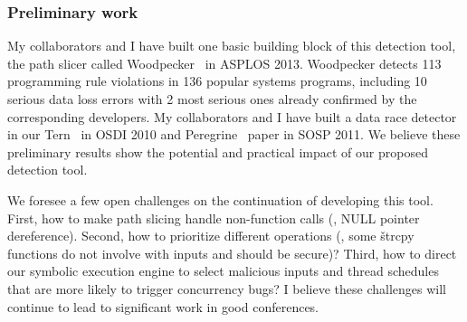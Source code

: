 



 

\subsubsection{Preliminary work}\label{sec:detect-result}

My collaborators and I have built one basic building block of this detection 
tool, the path slicer called Woodpecker~\cite{woodpecker:asplos13} in ASPLOS 
2013. Woodpecker detects 113 programming rule violations in 136 popular systems 
programs, including 10 serious data loss errors with 2 most serious ones 
already confirmed by the corresponding developers. My collaborators and I have 
built a data race detector in our Tern~\cite{cui:tern:osdi10} in OSDI 2010 and 
Peregrine~\cite{peregrine:sosp11} paper in SOSP 2011. We believe these 
preliminary results show the potential and practical impact of our proposed 
detection tool.



We foresee a few open challenges on the continuation of developing this tool. 
First, how to make path slicing handle non-function calls (\eg, NULL pointer 
dereference). Second, how to prioritize different operations (\eg, some 
\v{strcpy} functions do not involve with inputs and should be secure)? Third, 
how to direct our symbolic execution engine to select malicious inputs and 
thread schedules that are more likely to trigger concurrency bugs? I believe 
these challenges will continue to lead to significant work in good conferences.

